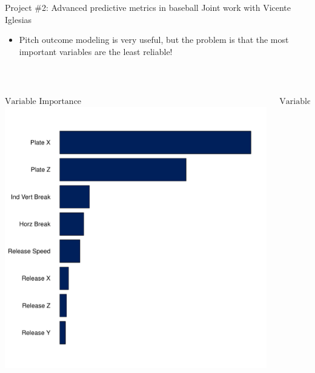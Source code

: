 \documentclass{beamer}
\begin{document}
\begin{frame}{Project \#2: Advanced predictive metrics in baseball}
  {Joint work with Vicente Iglesias}
  \begin{itemize}
    \item Pitch outcome modeling is very useful, but the problem is that the most important variables are the least reliable!
  \end{itemize}
  ~
  \begin{columns}
    \begin{column}{0.5\textwidth}
      \centering
      $\mbox{Variable Importance}$\\
      \includegraphics[width = \textwidth]{images/feature_importance.pdf}
    \end{column}
    \begin{column}{0.5\textwidth}
      \centering
      $\mbox{Variable Reliability}$\\

\end{column}
\end{columns}
\end{frame}
\end{document}
